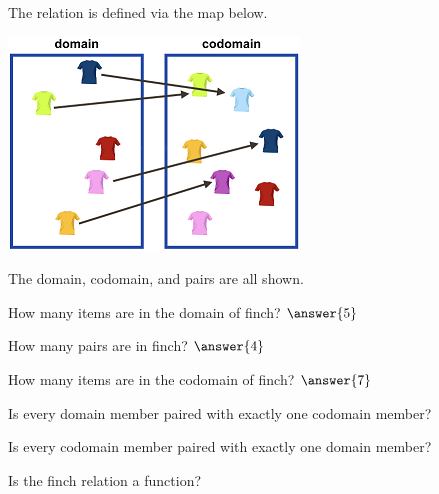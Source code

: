 \documentclass{ximera}
\begin{document}
  
  \begin{definition}
The relation  is defined via the map below.

  \includegraphics[width=292px,height=214px]{pics/r32.png}
  
  The domain, codomain, and pairs are all shown.


  
  \end{definition}
  


\begin{exercise}
How many items are in the domain of finch? $\answer{5}$
\end{exercise}


\begin{exercise}
How many pairs are in finch? $\answer{4}$
\end{exercise}

\begin{exercise}
How many items are in the codomain of finch? $\answer{7}$
\end{exercise}




\begin{exercise}
Is every domain member paired with exactly one codomain member?

  \begin{multipleChoice}
  \end{multipleChoice}
\end{exercise}


\begin{exercise}
Is every codomain member paired with exactly one domain member?

  \begin{multipleChoice}
  \end{multipleChoice}
\end{exercise}



\begin{exercise}
Is the finch relation a function?

  \begin{multipleChoice}
  \end{multipleChoice}
\end{exercise}
\end{document}
